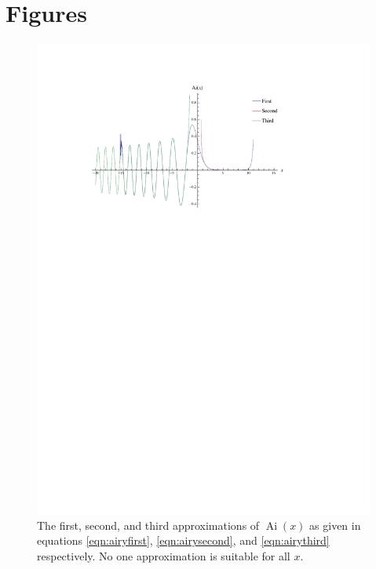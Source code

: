 \documentclass[]{article}
\newcommand{\Ai}[1]{\ensuremath{\operatorname{Ai}({#1})}}
\begin{document}
\section{Figures}\label{sec:figures}

\begin{figure}[H]
	\hspace*{-0.15\textwidth}
	\centering
	\includegraphics[scale=1.3]{approximations}
	\caption{The first, second, and third approximations of \Ai{x} as given in equations \ref{eqn:airyfirst}, \ref{eqn:airysecond}, and \ref{eqn:airythird} respectively. No one approximation is suitable for all $x$.}
	\label{fig:approximations}
\end{figure}
\end{document}
